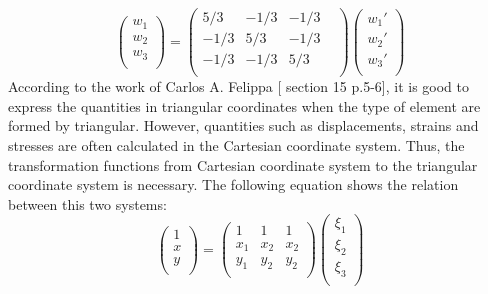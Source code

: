 \begin{equation}
\begin{pmatrix}
w_1 \\
w_2 \\
w_3 \\
\end{pmatrix} = \begin{pmatrix}
5/3 & -1/3 & -1/3 &    \\
-1/3 & 5/3 & -1/3 &    \\
-1/3 & -1/3 & 5/3 &    \\
\end{pmatrix} \begin{pmatrix}
{w_1}' \\
{w_2}' \\
{w_3}' \\
\end{pmatrix}
\end{equation}
According to the work of Carlos A. Felippa [\cite{Felippa} section 15 p.5-6], it is good to express the quantities in triangular coordinates when the type of element are formed by triangular. However, quantities such as displacements, strains and stresses are often calculated in the Cartesian coordinate system. Thus, the transformation functions from Cartesian coordinate system to the triangular coordinate system is necessary. The following equation shows the relation between this two systems:
\begin{equation}
\begin{pmatrix}
1 \\
x \\
y \\
\end{pmatrix}
= 
\begin{pmatrix}
1&1&1 \\
x_1&x_2&x_2 \\
y_1&y_2&y_2 \\
\end{pmatrix}
\begin{pmatrix}
\xi_1 \\
\xi_2 \\
\xi_3 \\
\end{pmatrix}
\end{equation}

